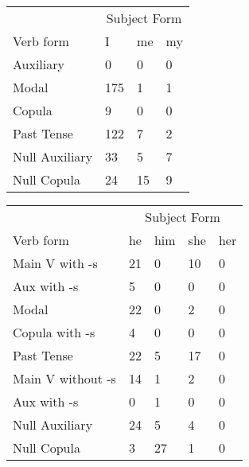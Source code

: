 \begin{table}[]
    \begin{minipage}{0.5\textwidth}
    \centering
    \begin{tabular}{@{}llll@{}}
        \toprule
            &\multicolumn{3}{c}{Subject Form}\\
            \cline{2-4}
        Verb form & I & me & my \\
        \midrule
        Auxiliary & 0 & 0 & 0 \\
        Modal & 175 & 1 & 1 \\
        Copula & 9 & 0 & 0 \\
        Past Tense & 122 & 7 & 2 \\
        \hline
        Null Auxiliary & 33 & 5 & 7 \\
        Null Copula & 24 & 15 & 9 \\
        \bottomrule
    \end{tabular}
\end{minipage}
\begin{minipage}{0.5\textwidth}
    \centering
    \begin{tabular}{@{}lllll@{}}
        \toprule
            &\multicolumn{4}{c}{Subject Form}\\
            \cline{2-5}
        Verb form & he & him & she & her \\
        \midrule
        Main V with -s & 21 & 0 & 10 & 0 \\
        Aux with -s & 5 & 0 & 0 & 0 \\
        Modal & 22 & 0 & 2 & 0 \\
        Copula with -s & 4 & 0 & 0 & 0 \\
        Past Tense & 22 & 5 & 17 & 0 \\
        \hline
        Main V without -s & 14 & 1 & 2 & 0 \\
        Aux with -s & 0 & 1 & 0 & 0 \\
        Null Auxiliary & 24 & 5 & 4 & 0 \\
        Null Copula & 3 & 27 & 1 & 0 \\
        \bottomrule
    \end{tabular}
\end{minipage}
\end{table}
